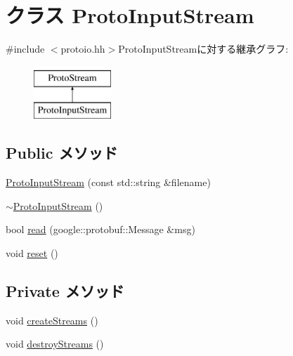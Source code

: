 \hypertarget{classProtoInputStream}{
\section{クラス ProtoInputStream}
\label{classProtoInputStream}
}


{\ttfamily \#include $<$protoio.hh$>$}ProtoInputStreamに対する継承グラフ:\begin{figure}[H]
\begin{center}
\leavevmode
\includegraphics[height=2cm]{classProtoInputStream}
\end{center}
\end{figure}
\subsection*{Public メソッド}
\begin{DoxyCompactItemize}
\item 
\hyperlink{classProtoInputStream_a98d96d79c96828f28c14d812bd3b43a7}{ProtoInputStream} (const std::string \&filename)
\item 
\hyperlink{classProtoInputStream_a26df47bdbd419ade481a0b13dbfca644}{$\sim$ProtoInputStream} ()
\item 
bool \hyperlink{classProtoInputStream_a4b1481de1970fef94f28772e00b4ae53}{read} (google::protobuf::Message \&msg)
\item 
void \hyperlink{classProtoInputStream_ad20897c5c8bd47f5d4005989bead0e55}{reset} ()
\end{DoxyCompactItemize}
\subsection*{Private メソッド}
\begin{DoxyCompactItemize}
\item 
void \hyperlink{classProtoInputStream_a120791921d99499a4f35da13544dca57}{createStreams} ()
\item 
void \hyperlink{classProtoInputStream_a47259bcb029441264a635ffc9483349c}{destroyStreams} ()
\end{DoxyCompactItemize}
